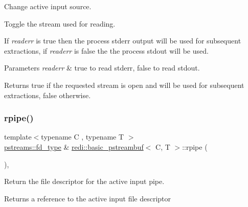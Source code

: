 Change active input source. 

Toggle the stream used for reading.

If {\itshape readerr} is {\ttfamily true} then the process\textquotesingle{} {\ttfamily stderr} output will be used for subsequent extractions, if {\itshape readerr} is false the the process\textquotesingle{} stdout will be used. 
\begin{DoxyParams}{Parameters}
{\em readerr} & {\ttfamily true} to read {\ttfamily stderr}, {\ttfamily false} to read {\ttfamily stdout}. \\
\hline
\end{DoxyParams}
\begin{DoxyReturn}{Returns}
{\ttfamily true} if the requested stream is open and will be used for subsequent extractions, {\ttfamily false} otherwise. 
\end{DoxyReturn}
\mbox{\label{classredi_1_1basic__pstreambuf_accdb0b3a802ffb924c66cfffed2563dd}} 
\subsubsection{\texorpdfstring{rpipe()}{rpipe()}\hspace{0.1cm}{\footnotesize\ttfamily [1/2]}}
{\footnotesize\ttfamily template$<$typename C , typename T $>$ \\
\mbox{\hyperlink{structredi_1_1pstreams_add0b7eaed16eb6c22a56012958d85b1d}{pstreams\+::fd\+\_\+type}} \& \mbox{\hyperlink{classredi_1_1basic__pstreambuf}{redi\+::basic\+\_\+pstreambuf}}$<$ C, T $>$\+::rpipe (\begin{DoxyParamCaption}{ }\end{DoxyParamCaption})\hspace{0.3cm}{\ttfamily [inline]}, {\ttfamily [protected]}}



Return the file descriptor for the active input pipe. 

\begin{DoxyReturn}{Returns}
a reference to the active input file descriptor 
\end{DoxyReturn}
\mbox{\label{classredi_1_1basic__pstreambuf_a0b9241b9835a5978a0b9b183c8f2ed81}} 
